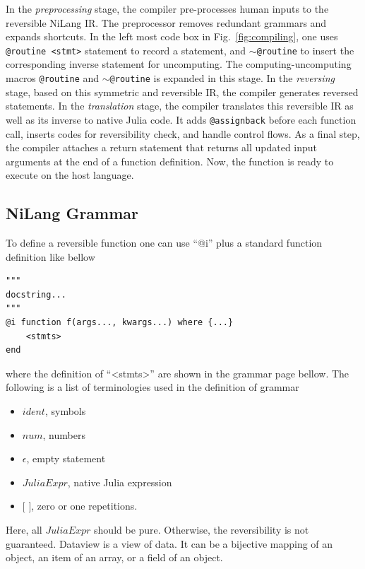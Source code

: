 \documentclass{article}
\newcommand{\<}{\langle}
\renewcommand{\>}{\rangle}
\newcommand{\Fig}[1]{Fig.~\ref{#1}}
\theoremstyle{definition}\newtheorem{definition}{\textit{Definition}}
\begin{document}
In the \textit{preprocessing} stage, the compiler pre-processes human inputs to the reversible NiLang IR.
The preprocessor removes redundant grammars and expands shortcuts. In the left most code box in \Fig{fig:compiling}, one uses \texttt{@routine <stmt>} statement to record a statement, and \texttt{$\sim$@routine} to insert the corresponding inverse statement for uncomputing.
The computing-uncomputing macros \texttt{@routine} and \texttt{$\sim$@routine} is expanded in this stage.
In the \textit{reversing} stage, based on this symmetric and reversible IR, the compiler generates reversed statements.
In the \textit{translation} stage, the compiler translates this reversible IR as well as its inverse to native Julia code. It adds \texttt{@assignback} before each function call, inserts codes for reversibility check, and handle control flows.
As a final step, the compiler attaches a return statement that returns all updated input arguments at the end of a function definition.
Now, the function is ready to execute on the host language.


\subsection{NiLang Grammar}\label{app:grammar}
To define a reversible function one can use ``@i'' plus a standard function definition like bellow

\begin{minipage}{.88\columnwidth}
\begin{lstlisting}[basicstyle=\small\ttfamily,columns=fullflexible]
"""
docstring...
"""
@i function f(args..., kwargs...) where {...}
    <stmts>
end
\end{lstlisting}
\end{minipage}

where the definition of ``<stmts>'' are shown in the grammar page bellow.
The following is a list of terminologies used in the definition of grammar
\begin{itemize}
    \item $ident$, symbols
    \item $num$, numbers
    \item $\epsilon$, empty statement
    \item $JuliaExpr$, native Julia expression
    \item $[$ $]$,  zero or one repetitions.
\end{itemize}
Here, all $JuliaExpr$ should be pure. Otherwise, the reversibility is not guaranteed.
Dataview is a view of data. It can be a bijective mapping of an object, an item of an array, or a field of an object.
\end{document}
